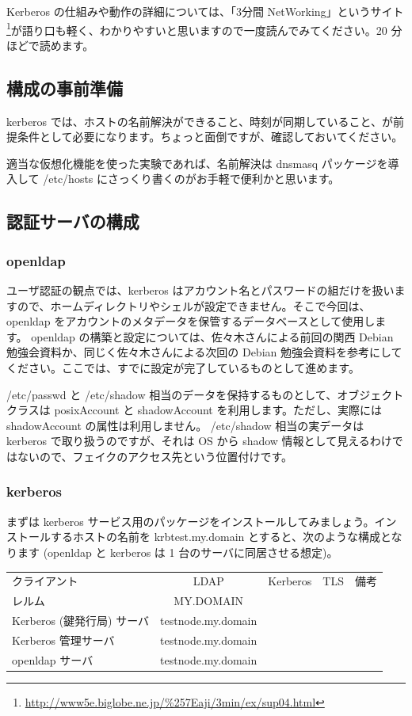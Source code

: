 \documentclass[mingoth,a4paper]{jsarticle}
\begin{document}
Kerberos の仕組みや動作の詳細については、「3分間 NetWorking」というサイト\footnote{\url{http://www5e.biglobe.ne.jp/\%257Eaji/3min/ex/sup04.html}}が語り口も軽く、わかりやすいと思いますので一度読んでみてください。20 分ほどで読めます。

\subsection{構成の事前準備}
kerberos では、ホストの名前解決ができること、時刻が同期していること、が前提条件として必要になります。ちょっと面倒ですが、確認しておいてください。

適当な仮想化機能を使った実験であれば、名前解決は dnsmasq パッケージを導入して /etc/hosts にさっくり書くのがお手軽で便利かと思います。

\subsection{認証サーバの構成}

\subsubsection{openldap}
ユーザ認証の観点では、kerberos はアカウント名とパスワードの組だけを扱いますので、ホームディレクトリやシェルが設定できません。そこで今回は、openldap をアカウントのメタデータを保管するデータベースとして使用します。
openldap の構築と設定については、佐々木さんによる前回の関西 Debian 勉強会資料か、同じく佐々木さんによる次回の Debian 勉強会資料を参考にしてください。ここでは、すでに設定が完了しているものとして進めます。

/etc/passwd と /etc/shadow 相当のデータを保持するものとして、オブジェクトクラスは posixAccount と shadowAccount を利用します。ただし、実際には shadowAccount の属性は利用しません。
/etc/shadow 相当の実データは kerberos で取り扱うのですが、それは OS から shadow 情報として見えるわけではないので、フェイクのアクセス先という位置付けです。

\subsubsection{kerberos}

まずは kerberos サービス用のパッケージをインストールしてみましょう。インストールするホストの名前を krbtest.my.domain とすると、次のような構成となります (openldap と kerberos は 1 台のサーバに同居させる想定)。

\begin{table}[htb]
  \begin{tabular}{lcccr}
    クライアント & LDAP & Kerberos & TLS & 備考 \\

    レルム & MY.DOMAIN \\
    Kerberos (鍵発行局) サーバ & testnode.my.domain \\
    Kerberos 管理サーバ & testnode.my.domain \\
    openldap サーバ & testnode.my.domain \\
  \end{tabular}
\end{table}
\end{document}
